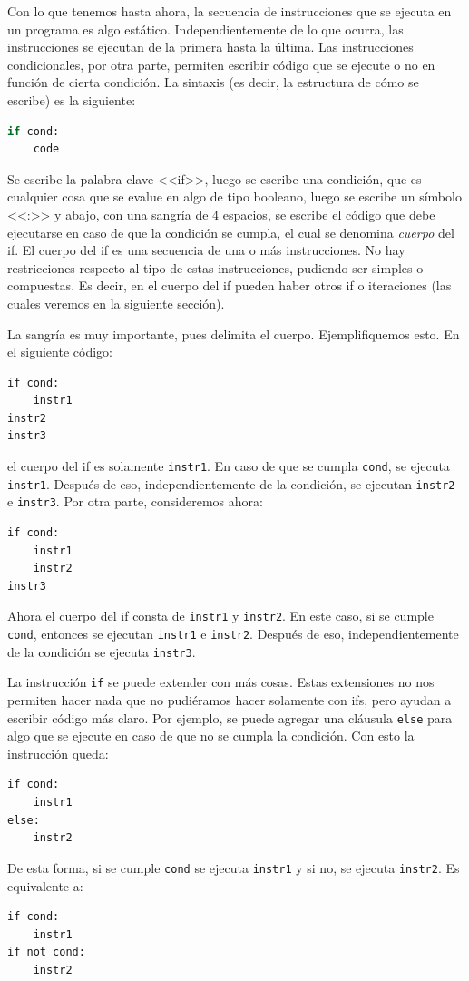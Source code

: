 \documentclass[a4paper, 12pt]{report}
\theoremstyle{definition}
\begin{document}
Con lo que tenemos hasta ahora, la secuencia de instrucciones que se ejecuta en un programa es algo estático. Independientemente de lo que ocurra, las instrucciones se ejecutan de la primera hasta la última. Las instrucciones condicionales, por otra parte, permiten escribir código que se ejecute o no en función de cierta condición. La sintaxis (es decir, la estructura de cómo se escribe) es la siguiente:
\begin{lstlisting}[language=python]
if cond:
    code
\end{lstlisting}
Se escribe la palabra clave <<if>>, luego se escribe una condición, que es cualquier cosa que se evalue en algo de tipo booleano, luego se escribe un símbolo <<:>> y abajo, con una sangría de 4 espacios, se escribe el código que debe ejecutarse en caso de que la condición se cumpla, el cual se denomina {\sl cuerpo} del if. El cuerpo del if es una secuencia de una o más instrucciones. No hay restricciones respecto al tipo de estas instrucciones, pudiendo ser simples o compuestas. Es decir, en el cuerpo del if pueden haber otros if o iteraciones (las cuales veremos en la siguiente sección).

La sangría es muy importante, pues delimita el cuerpo. Ejemplifiquemos esto. En el siguiente código:
\begin{verbatim}
if cond:
    instr1
instr2
instr3
\end{verbatim}
el cuerpo del if es solamente {\tt instr1}. En caso de que se cumpla {\tt cond}, se ejecuta {\tt instr1}. Después de eso, independientemente de la condición, se ejecutan {\tt instr2} e {\tt instr3}. Por otra parte, consideremos ahora:
\begin{verbatim}
if cond:
    instr1
    instr2
instr3
\end{verbatim}
Ahora el cuerpo del if consta de {\tt instr1} y {\tt instr2}. En este caso, si se cumple {\tt cond}, entonces se ejecutan {\tt instr1} e {\tt instr2}. Después de eso, independientemente de la condición se ejecuta {\tt instr3}.

La instrucción {\tt if} se puede extender con más cosas. Estas extensiones no nos permiten hacer nada que no pudiéramos hacer solamente con ifs, pero ayudan a escribir código más claro. Por ejemplo, se puede agregar una cláusula {\tt else} para algo que se ejecute en caso de que no se cumpla la condición. Con esto la instrucción queda:
\begin{verbatim}
if cond:
    instr1
else:
    instr2
\end{verbatim}
De esta forma, si se cumple {\tt cond} se ejecuta {\tt instr1} y si no, se ejecuta {\tt instr2}. Es equivalente a:
\begin{verbatim}
if cond:
    instr1
if not cond:
    instr2
\end{verbatim}
\end{document}
